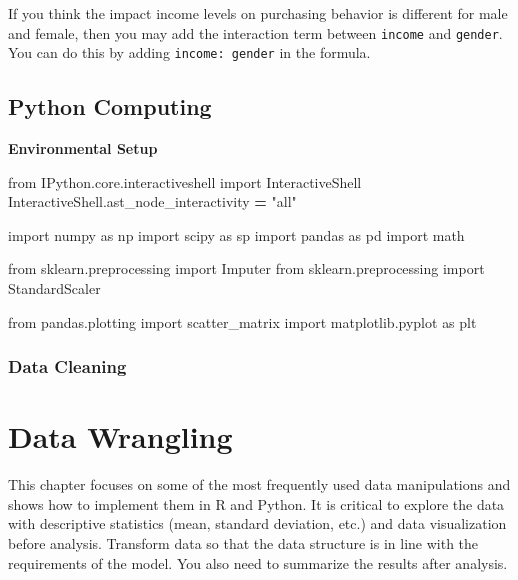 \documentclass[12pt,]{krantz}
\newenvironment{Shaded}{\begin{snugshade}}{\end{snugshade}}
\newcommand{\StringTok}[1]{\textcolor[rgb]{0.31,0.60,0.02}{{#1}}}
\newcommand{\ImportTok}[1]{{#1}}
\newcommand{\OperatorTok}[1]{\textcolor[rgb]{0.81,0.36,0.00}{\textbf{{#1}}}}
\newcommand{\NormalTok}[1]{{#1}}
\theoremstyle{definition}
\theoremstyle{definition}
\theoremstyle{remark}
\begin{document}
If you think the impact income levels on purchasing behavior is
different for male and female, then you may add the interaction term
between \texttt{income} and \texttt{gender}. You can do this by adding
\texttt{income:\ gender} in the formula.

\section{Python Computing}\label{python-computing}

\textbf{Environmental Setup}

\begin{Shaded}
\begin{Highlighting}[]
\ImportTok{from} \NormalTok{IPython.core.interactiveshell }\ImportTok{import} \NormalTok{InteractiveShell}
\NormalTok{InteractiveShell.ast_node_interactivity }\OperatorTok{=} \StringTok{"all"}

\ImportTok{import} \NormalTok{numpy }\ImportTok{as} \NormalTok{np}
\ImportTok{import} \NormalTok{scipy }\ImportTok{as} \NormalTok{sp}
\ImportTok{import} \NormalTok{pandas }\ImportTok{as} \NormalTok{pd}
\ImportTok{import} \NormalTok{math}

\ImportTok{from} \NormalTok{sklearn.preprocessing }\ImportTok{import} \NormalTok{Imputer}
\ImportTok{from} \NormalTok{sklearn.preprocessing }\ImportTok{import} \NormalTok{StandardScaler}

\ImportTok{from} \NormalTok{pandas.plotting }\ImportTok{import} \NormalTok{scatter_matrix}
\ImportTok{import} \NormalTok{matplotlib.pyplot }\ImportTok{as} \NormalTok{plt}
\end{Highlighting}
\end{Shaded}

\subsection{Data Cleaning}\label{data-cleaning-1}

\chapter{Data Wrangling}\label{data-wrangling}

This chapter focuses on some of the most frequently used data
manipulations and shows how to implement them in R and Python. It is
critical to explore the data with descriptive statistics (mean, standard
deviation, etc.) and data visualization before analysis. Transform data
so that the data structure is in line with the requirements of the
model. You also need to summarize the results after analysis.
\end{document}
